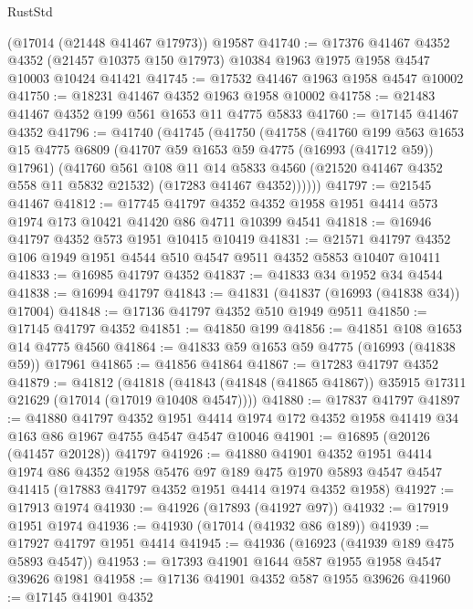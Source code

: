 \begin{lexlean}{RustStd}
\begin{coremodule}
    (@17014 (@21448 @41467 @17973))
    @19587
@41740 := @17376
    @41467
    @4352
    @4352
    (@21457 @10375 @150 @17973)
    @10384
    @1963
    @1975
    @1958
    @4547
    @10003
    @10424
    @41421
@41745 := @17532 @41467 @1963 @1958 @4547 @10002
@41750 := @18231 @41467 @4352 @1963 @1958 @10002
@41758 := @21483 @41467 @4352 @199 @561 @1653 @11 @4775 @5833
@41760 := @17145 @41467 @4352
@41796 := @41740
    (@41745
      (@41750
        (@41758
          (@41760
            @199
            @563
            @1653
            @15
            @4775
            @6809
            (@41707 @59 @1653 @59 @4775 (@16993 (@41712 @59)) @17961)
            (@41760
              @561
              @108
              @11
              @14
              @5833
              @4560
              (@21520 @41467 @4352 @558 @11 @5832 @21532)
              (@17283 @41467 @4352))))))
@41797 := @21545 @41467
@41812 := @17745
    @41797
    @4352
    @4352
    @1958
    @1951
    @4414
    @573
    @1974
    @173
    @10421
    @41420
    @86
    @4711
    @10399
    @4541
@41818 := @16946 @41797 @4352 @573 @1951 @10415 @10419
@41831 := @21571 @41797 @4352 @106 @1949 @1951 @4544 @510 @4547 @9511 @4352 @5853 @10407 @10411
@41833 := @16985 @41797 @4352
@41837 := @41833 @34 @1952 @34 @4544
@41838 := @16994 @41797
@41843 := @41831 (@41837 (@16993 (@41838 @34)) @17004)
@41848 := @17136 @41797 @4352 @510 @1949 @9511
@41850 := @17145 @41797 @4352
@41851 := @41850 @199
@41856 := @41851 @108 @1653 @14 @4775 @4560
@41864 := @41833 @59 @1653 @59 @4775 (@16993 (@41838 @59)) @17961
@41865 := @41856 @41864
@41867 := @17283 @41797 @4352
@41879 := @41812
    (@41818 (@41843 (@41848 (@41865 @41867)) @35915 @17311 @21629 (@17014 (@17019 @10408 @4547))))
@41880 := @17837 @41797
@41897 := @41880
    @41797
    @4352
    @1951
    @4414
    @1974
    @172
    @4352
    @1958
    @41419
    @34
    @163
    @86
    @1967
    @4755
    @4547
    @4547
    @10046
@41901 := @16895 (@20126 (@41457 @20128)) @41797
@41926 := @41880
    @41901
    @4352
    @1951
    @4414
    @1974
    @86
    @4352
    @1958
    @5476
    @97
    @189
    @475
    @1970
    @5893
    @4547
    @4547
    @41415
    (@17883 @41797 @4352 @1951 @4414 @1974 @4352 @1958)
@41927 := @17913 @1974
@41930 := @41926 (@17893 (@41927 @97))
@41932 := @17919 @1951 @1974
@41936 := @41930 (@17014 (@41932 @86 @189))
@41939 := @17927 @41797 @1951 @4414
@41945 := @41936 (@16923 (@41939 @189 @475 @5893 @4547))
@41953 := @17393 @41901 @1644 @587 @1955 @1958 @4547 @39626 @1981
@41958 := @17136 @41901 @4352 @587 @1955 @39626
@41960 := @17145 @41901 @4352

\end{coremodule}
\end{lexlean}
